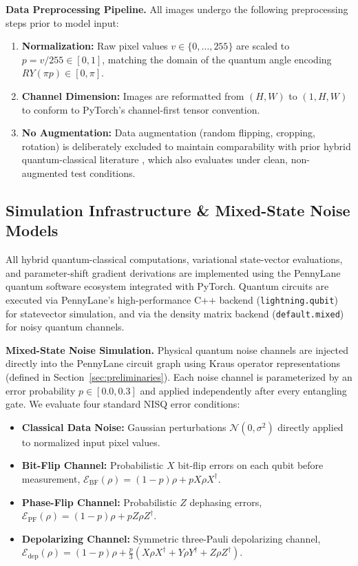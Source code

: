 \documentclass[journal]{IEEEtran}
\begin{document}
\textbf{Data Preprocessing Pipeline.} All images undergo the following preprocessing steps prior to model input:
\begin{enumerate}
    \item \textbf{Normalization:} Raw pixel values $v \in \{0, \dots, 255\}$ are scaled to $p = v / 255 \in [0, 1]$, matching the domain of the quantum angle encoding $RY(\pi p) \in [0, \pi]$.
    \item \textbf{Channel Dimension:} Images are reformatted from $(H, W)$ to $(1, H, W)$ to conform to PyTorch's channel-first tensor convention.
    \item \textbf{No Augmentation:} Data augmentation (random flipping, cropping, rotation) is deliberately excluded to maintain comparability with prior hybrid quantum-classical literature \cite{henderson2020quanvolutional, senokosov2024quantum}, which also evaluates under clean, non-augmented test conditions.
\end{enumerate}

\subsection{Simulation Infrastructure \& Mixed-State Noise Models}
All hybrid quantum-classical computations, variational state-vector evaluations, and parameter-shift gradient derivations are implemented using the PennyLane quantum software ecosystem \cite{bergholm2018pennylane} integrated with PyTorch. Quantum circuits are executed via PennyLane's high-performance C++ backend (\texttt{lightning.qubit}) for statevector simulation, and via the density matrix backend (\texttt{default.mixed}) for noisy quantum channels.

\textbf{Mixed-State Noise Simulation.} Physical quantum noise channels are injected directly into the PennyLane circuit graph using Kraus operator representations (defined in Section~\ref{sec:preliminaries}). Each noise channel is parameterized by an error probability $p \in [0.0, 0.3]$ and applied independently after every entangling gate. We evaluate four standard NISQ error conditions:
\begin{itemize}
    \item \textbf{Classical Data Noise:} Gaussian perturbations $\mathcal{N}(0, \sigma^2)$ directly applied to normalized input pixel values.
    \item \textbf{Bit-Flip Channel:} Probabilistic $X$ bit-flip errors on each qubit before measurement, $\mathcal{E}_{\mathrm{BF}}(\rho) = (1-p)\rho + p X\rho X^\dagger$.
    \item \textbf{Phase-Flip Channel:} Probabilistic $Z$ dephasing errors, $\mathcal{E}_{\mathrm{PF}}(\rho) = (1-p)\rho + p Z\rho Z^\dagger$.
    \item \textbf{Depolarizing Channel:} Symmetric three-Pauli depolarizing channel, $\mathcal{E}_{\mathrm{dep}}(\rho) = (1-p)\rho + \frac{p}{3}(X\rho X^\dagger + Y\rho Y^\dagger + Z\rho Z^\dagger)$.
\end{itemize}
\end{document}
